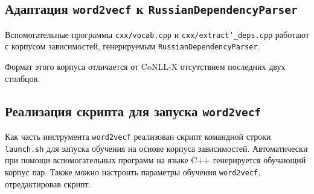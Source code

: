 \subsection{Адаптация \texttt{word2vecf} к \texttt{RussianDependencyParser}}

Вспомогательные программы \texttt{cxx/vocab.cpp} и \texttt{cxx/extract\char`_deps.cpp} работают с корпусом зависимостей, генерируемым \texttt{RussianDependencyParser}.

Формат этого корпуса отличается от CoNLL-X отсутствием последних двух столбцов.

\subsection{Реализация скрипта для запуска \texttt{word2vecf}}

Как часть инструмента \texttt{word2vecf} реализован скрипт командной строки \texttt{launch.sh} для запуска обучения на основе корпуса зависимостей. Автоматически при помощи вспомогательных программ на языке C++ генерируется обучающий корпус пар. Также можно настроить параметры обучения \texttt{word2vecf}, отредактировав скрипт.